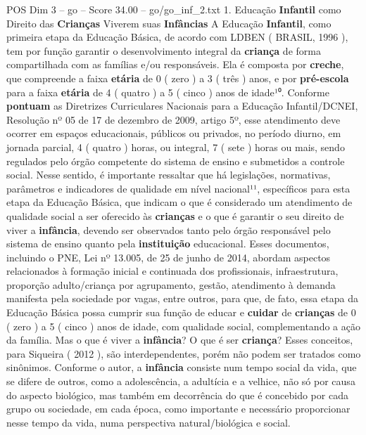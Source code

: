 \begin{textsample}{POS Dim 3 – go – Score 34.00 – go/go\_inf\_2.txt}  \label{ex:f3_pos_046}
1.
Educação \textbf{Infantil} como Direito das \textbf{Crianças} Viverem suas \textbf{Infâncias} A Educação \textbf{Infantil}, como primeira etapa da Educação Básica, de acordo com LDBEN ( BRASIL, 1996 ), tem por função garantir o desenvolvimento integral da \textbf{criança} de forma compartilhada com as famílias e/ou responsáveis.
Ela é composta por \textbf{creche}, que compreende a faixa \textbf{etária} de 0 ( zero ) a 3 ( três ) anos, e por \textbf{pré-escola} para a faixa \textbf{etária} de 4 ( quatro ) a 5 ( cinco ) anos de idade¹⁰.
Conforme \textbf{pontuam} as Diretrizes Curriculares Nacionais para a Educação Infantil/DCNEI, Resolução nº 05 de 17 de dezembro de 2009, artigo 5º, esse atendimento deve ocorrer em espaços educacionais, públicos ou privados, no período diurno, em jornada parcial, 4 ( quatro ) horas, ou integral, 7 ( sete ) horas ou mais, sendo regulados pelo órgão competente do sistema de ensino e submetidos a controle social.
Nesse sentido, é importante ressaltar que há legislações, normativas, parâmetros e indicadores de qualidade em nível nacional¹¹, específicos para esta etapa da Educação Básica, que indicam o que é considerado um atendimento de qualidade social a ser oferecido às \textbf{crianças} e o que é garantir o seu direito de viver a \textbf{infância}, devendo ser observados tanto pelo órgão responsável pelo sistema de ensino quanto pela \textbf{instituição} educacional.
Esses documentos, incluindo o PNE, Lei nº 13.005, de 25 de junho de 2014, abordam aspectos relacionados à formação inicial e continuada dos profissionais, infraestrutura, proporção adulto/criança por agrupamento, gestão, atendimento à demanda manifesta pela sociedade por vagas, entre outros, para que, de fato, essa etapa da Educação Básica possa cumprir sua função de educar e \textbf{cuidar} de \textbf{crianças} de 0 ( zero ) a 5 ( cinco ) anos de idade, com qualidade social, complementando a ação da família.
Mas o que é viver a \textbf{infância}?
O que é ser \textbf{criança}?
Esses conceitos, para Siqueira ( 2012 ), são interdependentes, porém não podem ser tratados como sinônimos.
Conforme o autor, a \textbf{infância} consiste num tempo social da vida, que se difere de outros, como a adolescência, a adultícia e a velhice, não só por causa do aspecto biológico, mas também em decorrência do que é concebido por cada grupo ou sociedade, em cada época, como importante e necessário proporcionar nesse tempo da vida, numa perspectiva natural/biológica e social.

\end{textsample}

